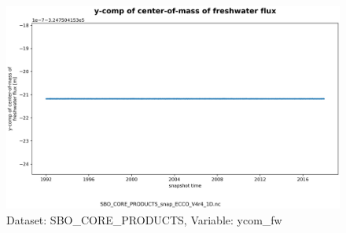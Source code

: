 \begin{figure}[H]
\centering
\includegraphics[scale=0.55]{../images/plots/v4r4/oneD_plots/SBO_Core_Products/ycom_fw.png}
\caption{Dataset: SBO\_CORE\_PRODUCTS, Variable: ycom\_fw}
\label{tab:table-SBO_CORE_PRODUCTS_ycom_fw-Plot}
\end{figure}
\newpage
\pagebreak
